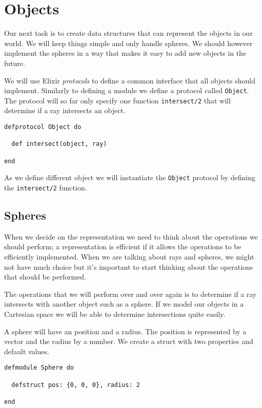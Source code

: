\documentclass[a4paper,11pt]{article}
\begin{document}
\section{Objects}

Our next task is to create data structures that can
represent the objects in our world. We will keep things simple and
only handle spheres. We should however implement the spheres in a way
that makes it easy to add new objects in the future.

We will use Elixir {\em protocols} to define a common interface that
all objects should implement. Similarly to defining a module we define
a protocol called {\tt Object}. The protocol will so far only specify
one function {\tt intersect/2} that will determine if a ray
intersects an object.

\begin{verbatim}
defprotocol Object do

  def intersect(object, ray)
  
end
\end{verbatim}

As we define different object we will instantiate the {\tt Object}
protocol by defining the {\tt intersect/2} function. 

\subsection*{Spheres}

When we decide on the representation we need to think about the
operations we should perform; a representation is efficient if it
allows the operations to be efficiently implemented. When we are
talking about rays and spheres, we might not have much choice but it's
important to start thinking about the operations that should be
performed.

The operations that we will perform over and over again is to
determine if a ray intersects with another object such as a sphere. If
we model our objects in a Cartesian space we will be able to
determine intersections quite easily.

A sphere will have an position and a radius. The position is
represented by a vector and the radius by a number. We create a
struct with two properties and default values.

\begin{verbatim}
defmodule Sphere do

  defstruct pos: {0, 0, 0}, radius: 2

end
\end{verbatim}
\end{document}
